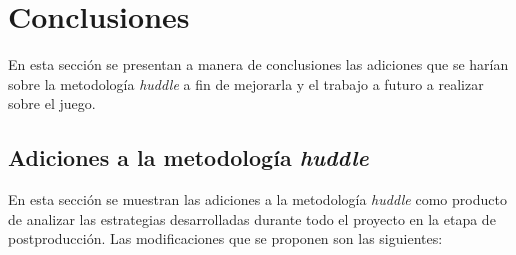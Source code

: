 \chapter{Conclusiones}
En esta sección se presentan a manera de conclusiones las adiciones que se harían
sobre la metodología \textit{huddle} a fin de mejorarla y el trabajo a futuro a
realizar sobre el juego.

\section{Adiciones a la metodología \textit{huddle}}
En esta sección se muestran las adiciones a la metodología \textit{huddle} como
producto de analizar las estrategias desarrolladas durante todo el proyecto en
la etapa de postproducción. Las modificaciones que se proponen son las siguientes:

